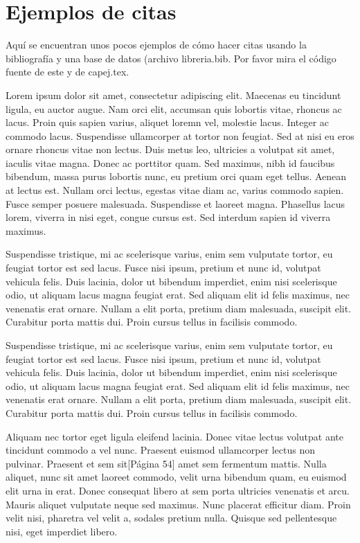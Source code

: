 \section{Ejemplos de citas}

Aquí se encuentran unos pocos ejemplos de cómo hacer citas usando la bibliografía y una base de datos (archivo libreria.bib. Por favor mira el código fuente de este y de capej.tex.

Lorem ipsum dolor sit amet, consectetur adipiscing elit. Maecenas eu tincidunt ligula, eu auctor augue. Nam orci elit, accumsan quis lobortis vitae, rhoncus ac lacus\cite{Dan}. Proin quis sapien varius, aliquet loremn \cite[pág 21]{Baz} vel, molestie lacus. Integer ac commodo lacus. Suspendisse ullamcorper at tortor non feugiat. Sed at nisi eu eros ornare rhoncus vitae non lectus. Duis metus leo, ultricies a volutpat sit amet, iaculis vitae magna. Donec ac porttitor quam. Sed maximus, nibh id faucibus bibendum, massa purus lobortis nunc, eu pretium orci quam eget tellus. Aenean\cite{Baz} at lectus est. Nullam orci lectus, egestas vitae diam ac, varius commodo sapien. Fusce semper posuere malesuada. Suspendisse et laoreet magna. Phasellus lacus lorem, viverra in nisi eget, congue cursus est. Sed interdum sapien id viverra maximus.

Suspendisse tristique, mi ac scelerisque varius, enim sem vulputate tortor, eu feugiat tortor est sed lacus. Fusce nisi ipsum, pretium et nunc id, volutpat vehicula felis. Duis lacinia, dolor ut bibendum imperdiet, enim nisi scelerisque odio, ut aliquam lacus magna feugiat erat. Sed aliquam elit id felis maximus, nec venenatis erat ornare. Nullam a elit porta, pretium diam malesuada, suscipit elit. Curabitur porta mattis dui. Proin cursus tellus in facilisis commodo.


Suspendisse tristique, mi ac scelerisque varius, enim sem vulputate tortor, eu feugiat tortor est sed lacus. Fusce nisi ipsum, pretium et nunc id, volutpat vehicula felis. Duis lacinia, dolor ut bibendum imperdiet, enim nisi scelerisque odio, ut aliquam lacus magna feugiat erat. Sed aliquam elit id felis maximus, nec venenatis erat ornare. Nullam a elit porta, pretium diam malesuada, suscipit elit. Curabitur porta mattis dui. Proin cursus tellus in facilisis commodo.

Aliquam nec tortor eget ligula eleifend lacinia. Donec vitae lectus volutpat ante tincidunt commodo a vel nunc. Praesent euismod ullamcorper lectus non pulvinar. Praesent\cite{book:vim-boo} et sem sit\cite{book:hac-vim}[Página 54] amet sem fermentum mattis. Nulla aliquet, nunc sit amet laoreet commodo, velit urna bibendum quam, eu euismod elit urna in erat. Donec consequat libero at sem porta ultricies venenatis et arcu. Mauris aliquet vulputate neque sed maximus. Nunc placerat efficitur\cite[pg-12]{book:vim-rec} diam. Proin velit nisi, pharetra vel velit a, sodales pretium nulla. Quisque sed pellentesque nisi, eget imperdiet\cite{book:lea-vi} libero.

